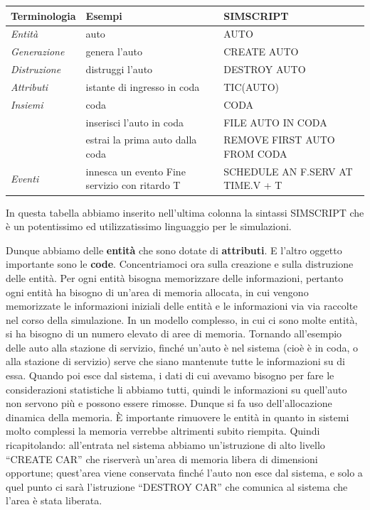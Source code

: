 \documentclass[11pt]{book}
\begin{document}
\vspace{11pt}
\begin{tabular}{lp{4cm}p{4cm}}
{\bf Terminologia} & {\bf Esempi} & {\bf SIMSCRIPT} \\\hline
{\em Entit\`a} & auto & AUTO \\
{\em Generazione} & genera l'auto & CREATE AUTO \\ 
{\em Distruzione} & distruggi l'auto & DESTROY AUTO \\\hline
{\em Attributi} & istante di ingresso in coda & TIC(AUTO) \\\hline
{\em Insiemi} & coda & CODA \\
& inserisci l'auto in coda & FILE AUTO IN CODA \\
& estrai la prima auto dalla coda & REMOVE FIRST AUTO FROM
CODA\\\hline
{\em Eventi} & innesca un evento Fine servizio con ritardo T &
SCHEDULE AN F.SERV AT TIME.V + T\\\hline
\end{tabular}
\vspace{11pt}

In questa tabella abbiamo inserito nell'ultima colonna la sintassi
SIMSCRIPT che \`e un potentissimo ed utilizzatissimo linguaggio per le
simulazioni.


Dunque abbiamo delle {\bf entit\`a} che sono dotate di {\bf
  attributi}. E l'altro oggetto importante sono le {\bf
  code}. Concentriamoci ora sulla creazione e sulla distruzione delle
entit\`a. Per ogni entit\`a bisogna memorizzare delle informazioni,
pertanto ogni entit\`a ha bisogno di un'area di memoria allocata, in
cui vengono memorizzate le informazioni iniziali delle entit\`a e le
informazioni via via raccolte nel corso della simulazione. In un
modello complesso, in cui ci sono molte entit\`a, si ha bisogno di un
numero elevato di aree di memoria. Tornando all'esempio delle auto
alla stazione di servizio, finch\'e un'auto \`e nel sistema (cio\`e \`e in
coda, o alla stazione di servizio) serve che siano mantenute tutte le
informazioni su di essa. Quando poi esce dal sistema, i dati di cui
avevamo bisogno per fare le considerazioni statistiche li abbiamo
tutti, quindi le informazioni su quell'auto non servono pi\`u e possono
essere rimosse. Dunque si fa uso dell'allocazione dinamica della
memoria. \`E importante rimuovere le entit\`a in quanto in sistemi molto
complessi la memoria verrebbe altrimenti subito riempita. Quindi
ricapitolando: all'entrata nel sistema abbiamo un'istruzione di alto
livello ``CREATE CAR'' che riserver\`a un'area di memoria libera di
dimensioni opportune; quest'area viene conservata finch\'e l'auto non
esce dal sistema, e solo a quel punto ci sar\`a l'istruzione ``DESTROY
CAR'' che comunica al sistema che l'area \`e stata liberata.
\end{document}
